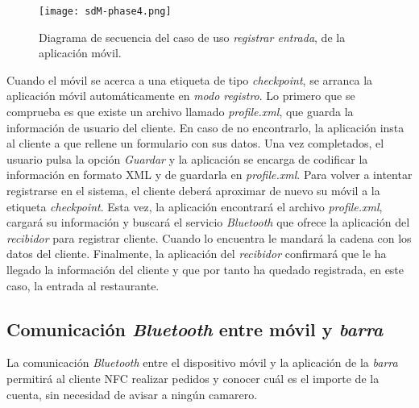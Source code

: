   \begin{figure}[!h]
    \begin{center}
      \texttt{[image: sdM-phase4.png]}
      \caption{Diagrama de secuencia del caso de uso \emph{registrar entrada},
      de la aplicación móvil.}
      \label{fig:sdM-phase4}
    \end{center}
  \end{figure}

Cuando el móvil se acerca a una etiqueta de tipo \emph{checkpoint}, se
arranca la aplicación móvil automáticamente en \emph{modo registro}. Lo
primero que se comprueba es que existe un archivo llamado \emph{profile.xml},
que guarda la información de usuario del cliente. En caso de no encontrarlo,
la aplicación insta al cliente a que rellene un formulario con sus datos.
Una vez completados, el usuario pulsa la opción \emph{Guardar} y la
aplicación se encarga de codificar la información en formato \acs{XML} y de
guardarla en \emph{profile.xml}. Para volver a intentar registrarse en el
sistema, el cliente deberá aproximar de nuevo su móvil a la etiqueta
\emph{checkpoint}. Esta vez, la aplicación encontrará el archivo
\emph{profile.xml}, cargará su información y buscará el servicio
\emph{Bluetooth} que ofrece la aplicación del \emph{recibidor} para
registrar cliente. Cuando lo encuentra le mandará la cadena con los datos
del cliente. Finalmente, la aplicación del \emph{recibidor} confirmará que
le ha llegado la información del cliente y que por tanto ha quedado
registrada, en este caso, la entrada al restaurante.

\subsection{Comunicación \emph{Bluetooth} entre móvil y \emph{barra}}
\label{subsec:mobile-bar}
La comunicación \emph{Bluetooth} entre el dispositivo móvil y la aplicación
de la \emph{barra} permitirá al cliente \acs{NFC} realizar pedidos y conocer
cuál es el importe de la cuenta, sin necesidad de avisar a ningún camarero.


